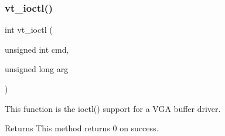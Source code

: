 \subsubsection{\texorpdfstring{vt\_ioctl()}{vt\_ioctl()}}
{\footnotesize\ttfamily int vt\+\_\+ioctl (\begin{DoxyParamCaption}\item[{unsigned int}]{cmd,  }\item[{unsigned long}]{arg }\end{DoxyParamCaption})}



This function is the ioctl() support for a V\+GA buffer driver. 

\begin{DoxyReturn}{Returns}
This method returns 0 on success. 
\end{DoxyReturn}
